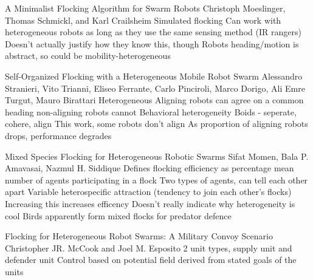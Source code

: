 
A Minimalist Flocking Algorithm for Swarm Robots
Christoph Moeslinger, Thomas Schmickl, and Karl Crailsheim
	Simulated flocking 
	Can work with heterogeneous robots as long as they use the same sensing method (IR rangers)
		Doesn't actually justify how they know this, though
		Robots heading/motion is abstract, so could be mobility-heterogeneous

Self-Organized Flocking with a Heterogeneous Mobile Robot Swarm
Alessandro Stranieri, Vito Trianni, Eliseo Ferrante, Carlo Pinciroli, Marco Dorigo, Ali Emre Turgut, Mauro Birattari
	Heterogeneous
	Aligning robots can agree on a common heading
	non-aligning robots cannot
	Behavioral heterogeneity
	Boids - seperate, cohere, align
		This work, some robots don't align
	As proportion of aligning robots drops, performance degrades

Mixed Species Flocking for Heterogeneous Robotic Swarms
Sifat Momen, Bala P. Amavasai, Nazmul H. Siddique 
	Defines flocking efficiency as percentage mean number of agents participating in a flock
	Two types of agents, can tell each other apart
	Variable heterospecific attraction (tendency to join each other's flocks)
		Increasing this increases efficency
	Doesn't really indicate why heterogeneity is cool
		Birds apparently form mixed flocks for predator defence

Flocking for Heterogeneous Robot Swarms: A Military Convoy Scenario
Christopher JR. McCook and Joel M. Esposito
	2 unit types, supply unit and defender unit
	Control based on potential field derived from stated goals of the units

